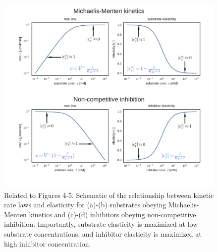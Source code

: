 \documentclass[12pt,a4paper]{article}
\begin{document}
\begin{figure}[ht!]
	\includegraphics[width=1.1\textwidth]{../manuscript/figS4.pdf}
	\caption{Related to Figures 4-5. Schematic of the relationship between kinetic rate laws and elasticity for (a)-(b) substrates obeying Michaelis-Menten kinetics and (c)-(d) inhibitors obeying non-competitive inhibition. Importantly, substrate elasticity is maximized at low substrate concentrations, and inhibitor elasticity is maximized at high inhibitor concentration.
	}
\end{figure}
\end{document}
